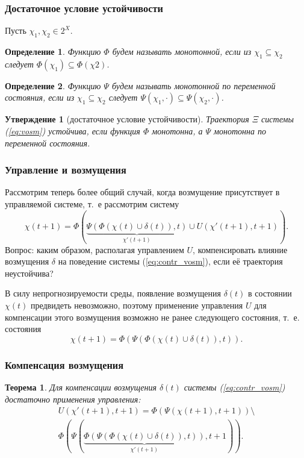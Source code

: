 \documentclass[default]{beamer}
\newtheorem{Theorem}{Теорема}
\newtheorem{Pred}{Утверждение}
\newtheorem{Def}{Определение}
\begin{document}
	\begin{frame}
		\frametitle{Достаточное условие устойчивости}
		
		Пусть $\chi_1,\chi_2\in 2^X$.
		\begin{Def}
			Функцию $\Phi$ будем называть монотонной, если из $\chi_1\subseteq\chi_2$ следует $\Phi(\chi_1)\subseteq\Phi(\chi2)$.
		\end{Def}
		
		\begin{Def}
			Функцию $\Psi$ будем называть монотонной по переменной состояния, если из $\chi_1\subseteq\chi_2$ следует $\Psi(\chi_1,\cdot)\subseteq\Psi(\chi_2,\cdot)$.
		\end{Def}
		
		\begin{Pred}[достаточное условие устойчивости]
			Траектория $\Xi$ системы (\ref{eq:vosm}) устойчива, если функция $\Phi$ монотонна, а $\Psi$ монотонна по переменной состояния.
			
		\end{Pred}		
	\end{frame}

	\begin{frame}
		\frametitle{Управление и возмущения}
		
		Рассмотрим теперь более общий случай, когда возмущение присутствует в управляемой системе, т.~е рассмотрим систему
		\begin{equation}\label{eq:contr_vosm}
			\chi(t+1) =\Phi(\underbrace{\Psi(\Phi(\chi(t)\cup\delta(t)),t)}_{\chi'(t+1)}\cup U(\chi'(t+1),t+1)).
		\end{equation}
		Вопрос: каким образом, располагая управлением $U$, компенсировать влияние возмущения $\delta$ на поведение системы (\ref{eq:contr_vosm}), если её траектория неустойчива?
		\par\bigskip
		В силу непрогнозируемости среды, появление возмущения $\delta(t)$ в состоянии $\chi(t)$ предвидеть невозможно, поэтому применение управления $U$ для компенсации этого возмущения  возможно не ранее следующего состояния, т.~е.  состояния 
		\begin{equation}
			\chi(t+1)=\Phi(\Psi(\Phi(\chi(t)\cup\delta(t)),t)).
		\end{equation}
	\end{frame}

	\begin{frame}
		\frametitle{Компенсация возмущения}
		
		\begin{Theorem}\label{th:compens}
			Для компенсации возмущения $\delta(t)$ системы (\ref{eq:contr_vosm}) достаточно применения управления:
			\begin{eqnarray}
				U(\chi'(t+1),t+1)=\Phi(\Psi(\chi(t+1),t+1))\setminus\nonumber\\
				\Phi(\Psi(\underbrace{\Phi(\Psi(\Phi(\chi(t)\cup\delta(t)),t))}_{\chi'(t+1)},t+1)).
			\end{eqnarray}
		\end{Theorem}
	\end{frame}
\end{document}
